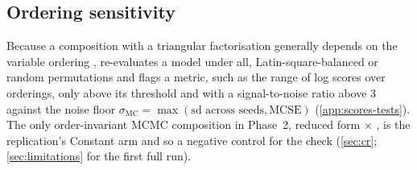 
\subsection{Ordering sensitivity}\label{sec:eval-ordering}

Because a composition with a triangular factorisation generally depends on the variable ordering
\citep{arias2023macroeconomic,chan2024large},  re-evaluates a
model under all, Latin-square-balanced or random permutations and flags a metric, such as the range of log scores over orderings, only above its
threshold and with a signal-to-noise ratio above 3 against the noise floor
$\sigma_{\mathrm{MC}} = \max(\text{sd across seeds}, \text{MCSE})$ (\cref{app:scores-tests}).
The only order-invariant MCMC composition in Phase~2, reduced form $\times$
 \citep{chan2022asymmetric}, is the replication's Constant arm and
so a negative control for the check (\cref{sec:cr}; \cref{sec:limitations} for the first full
run).
